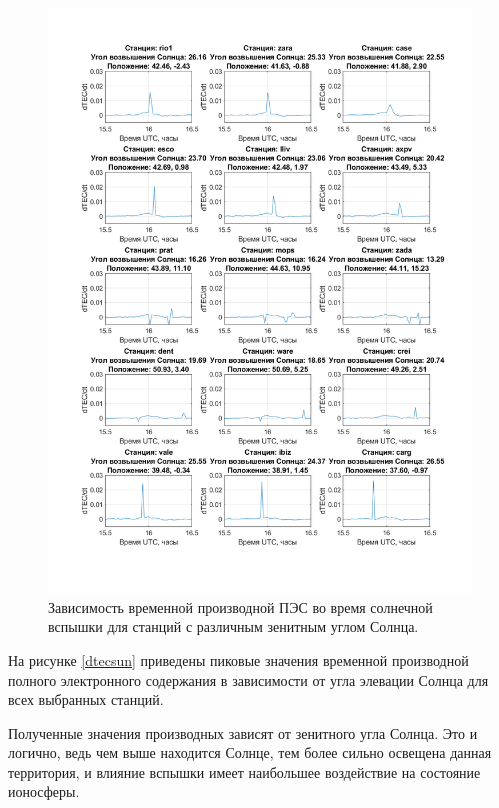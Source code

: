 \documentclass[a4paper]{article}
\begin{document}
\begin{figure}[h!]
\centering
\includegraphics[width = 1\linewidth]{pics/clean_pics/dtec15.png}
\caption{Зависимость временной производной ПЭС во время солнечной вспышки для станций с различным зенитным углом Солнца.}
\label{dtec15}
\end{figure}

\clearpage
\newpage

На рисунке \ref{dtecsun} приведены пиковые значения временной производной полного электронного содержания в зависимости от угла элевации Солнца для всех выбранных станций.

Полученные значения производных зависят от зенитного угла Солнца. Это и логично, ведь чем выше находится Солнце, тем более сильно освещена данная территория, и влияние вспышки имеет наибольшее воздействие на состояние ионосферы.
\end{document}
